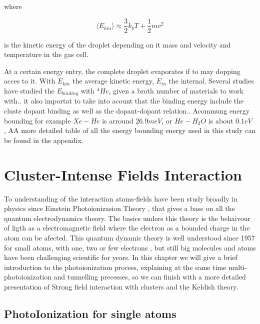 where

\begin{equation}
\langle E_{kin}\rangle \approx \dfrac{3}{2}k_{b}T + \dfrac{1}{2} m v^{2}
\end{equation}

is the kinetic energy of the droplet depending on it mass and velocity and temperature in the gas cell.

At a certain energy entry, the complete droplet evaporates if to may dopping acces to it. With $E_{kin}$ the average kinetic energy, $E_{in}$ the internal. Several studies have studied the $E_{binding}$ with $^{4}He$, given a broth number of materials to work with.. it also importat to take into acount that the binding energy include the cluste dopant binding as well as the dopant-dopant relation.\cite{toennies_spectroscopy_1998}. Acommung energy bounding for example $Xe-He$ is arround $26.9 meV$\cite{lewerenz_successive_1995}, or $He-H_{2}O$ is about $0.1 eV$ \cite{lewis_helium_2014}, AA more detailed table of all the energy bounding energy used in this study can be found in the appendix.

  
\section{Cluster-Intense Fields  Interaction}

To understanding of the interaction atoms-fields have been study broadly in physics since Einstein Photoionizasion Theory \cite{einstein_uber_1905}, that gives a base on all the quantum electrodynamics theory. The basics unders this theory is the behaivour of ligth as a electromagnetic field where the electron as a bounded charge in the atom can be afected.  This quantum dynamic theory is well understood since 1957 for small atoms, with one, two or few electrons \cite{a._bethe_quantum_1957}, but still big molecules and atoms have been challenging scientific for years. In this chapter we will give a brief introduction to the photoionization process, explaining at the same time multi-photoionization and tunnelling precesses, so we can finish with a more detailed presentation of Strong field interaction with clusters and the Keldish theory.


\subsection{PhotoIonization for single atoms}

